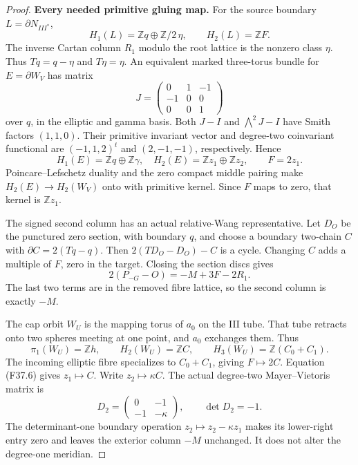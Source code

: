 \begin{proof}
\par\medskip\noindent\textbf{Every needed primitive gluing map.}
For the source boundary $L=\partial N_{III^*}$,
\[
 H_1(L)=\mathbb Zq\oplus\mathbb Z/2\,\eta,
 \qquad H_2(L)=\mathbb ZF.
\]
The inverse Cartan column $R_1$ modulo the root lattice is the
nonzero class $\eta$. Thus $Tq=q-\eta$ and $T\eta=\eta$.
An equivalent marked three-torus bundle for $E=\partial W_V$
has matrix
\[
 J=\begin{pmatrix}0&1&-1\\-1&0&0\\0&0&1\end{pmatrix}
\]
over $q$, in the elliptic and gamma basis. Both $J-I$ and
$\bigwedge^2J-I$ have Smith factors $(1,1,0)$. Their primitive
invariant vector and degree-two coinvariant functional are
$(-1,1,2)^t$ and $(2,-1,-1)$, respectively. Hence
\[
 H_1(E)=\mathbb Zq\oplus\mathbb Z\gamma,
 \quad H_2(E)=\mathbb Zz_1\oplus\mathbb Zz_2,
 \qquad F=2z_1.                                      \tag{F37.6}
\]
Poincare--Lefschetz duality and the zero compact middle pairing
make $H_2(E)\to H_2(W_V)$ onto with primitive kernel. Since $F$
maps to zero, that kernel is $\mathbb Zz_1$.

The signed second column has an actual relative-Wang representative.
Let $D_O$ be the punctured zero section, with boundary $q$, and
choose a boundary two-chain $C$ with $\partial C=2(Tq-q)$.
Then $2(TD_O-D_O)-C$ is a cycle. Changing $C$ adds a multiple
of $F$, zero in the target. Closing the section discs gives
\[
                  2(P_{-G}-O)=-M+3F-2R_1.
\]
The last two terms are in the removed fibre lattice, so the
second column is exactly $-M$.

The cap orbit $W_U$ is the mapping torus of $a_0$ on the III
tube. That tube retracts onto two spheres meeting at one point,
and $a_0$ exchanges them. Thus
\[
 \pi_1(W_U)=\mathbb Zh,\qquad H_2(W_U)=\mathbb ZC,
 \qquad H_3(W_U)=\mathbb Z(C_0+C_1).
\]
The incoming elliptic fibre specializes to $C_0+C_1$, giving
$F\mapsto2C$. Equation (F37.6) gives $z_1\mapsto C$.
Write $z_2\mapsto\kappa C$. The actual degree-two
Mayer--Vietoris matrix is
\[
 D_2=\begin{pmatrix}0&-1\\-1&-\kappa\end{pmatrix},
 \qquad \det D_2=-1.                                 \tag{F37.7}
\]
The determinant-one boundary operation $z_2\mapsto z_2-\kappa z_1$
makes its lower-right entry zero and leaves the exterior column
$-M$ unchanged. It does not alter the degree-one meridian.


\end{proof}
